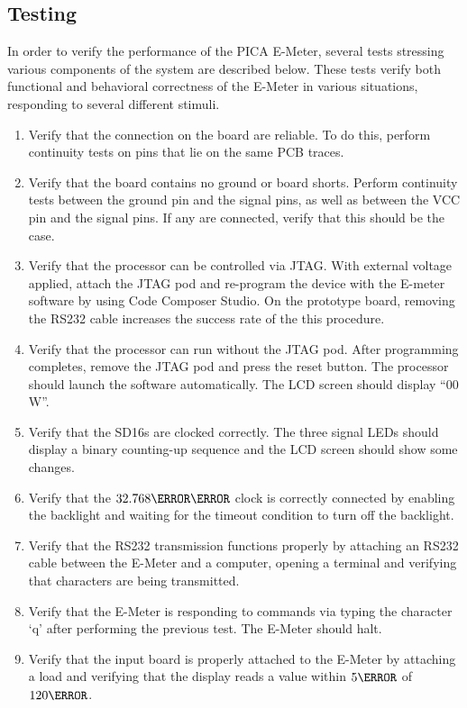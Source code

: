 \subsection{Testing} %
In order to verify the performance of the PICA E-Meter, several tests stressing various components of the system are described below. These tests verify both functional and behavioral correctness of the E-Meter in various situations, responding to several different stimuli.
\begin{enumerate}
  \item Verify that the connection on the board are reliable. To do this, perform continuity tests on pins that lie on the same \ac{PCB} traces.
  \item Verify that the board contains no ground or board shorts. Perform continuity tests between the ground pin and the signal pins, as well as between the VCC pin and the signal pins. If any are connected, verify that this should be the case.
  \item Verify that the processor can be controlled via \ac{JTAG}. With external voltage applied, attach the \ac{JTAG} pod and re-program the device with the E-meter software by using Code Composer Studio. On the prototype board, removing the RS232 cable increases the success rate of the this procedure.
  \item Verify that the processor can run without the \ac{JTAG} pod. After programming completes, remove the \ac{JTAG} pod and press the reset button. The processor should launch the software automatically. The \ac{LCD} screen should display ``00 W''.
  \item Verify that the SD16s are clocked correctly. The three signal \acp{LED} should display a binary counting-up sequence and the \ac{LCD} screen should show some changes.
  \item Verify that the $32.768\kilo\hertz$ clock is correctly connected by enabling the backlight and waiting for the timeout condition to turn off the backlight.
  \item Verify that the RS232 transmission functions properly by attaching an RS232 cable between the E-Meter and a computer, opening a terminal and verifying that characters are being transmitted.
  \item Verify that the E-Meter is responding to commands via typing the character `q' after performing the previous test. The E-Meter should halt.
  \item Verify that the input board is properly attached to the E-Meter by attaching a load and verifying that the display reads a value within $5\volt$ of $120\volt$.
\end{enumerate}

